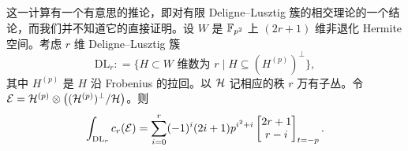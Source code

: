 \begin{ex}
这一计算有一个有意思的推论，即对有限 Deligne--Lusztig 簇的相交理论的一个结论，而我们并不知道它的直接证明。设 $W$ 是 ${\mathbb F}_{p^2}$ 上 $(2r+1)$ 维非退化 Hermite 空间。考虑 $r$ 维 Deligne--Lusztig 簇
\[
\mathrm{DL}_{r}: = \big\{ H \subset W \textrm{ 维数为 } r\;\big|\; H \subseteq (H^{(p)})^\perp \big\},
\]
其中 $H^{(p)}$ 是 $H$ 沿 Frobenius 的拉回。以 ${\mathcal H}$ 记相应的秩 $r$ 万有子丛。令 ${\mathcal E} = {\mathcal H}^{(p)} \otimes \big( ({\mathcal H}^{(p)})^\perp / {\mathcal H} \big)$。则
\begin{equation}\label{E: chern class on DL}
\int_{\mathrm{DL}_r} c_r( {\mathcal E})  = \sum_{i = 0}^r (-1)^i(2i+1) p^{i^2+i} \begin{bmatrix} 2r+1 \\ r-i\end{bmatrix}_{t=-p}.
\end{equation}
\end{ex}
